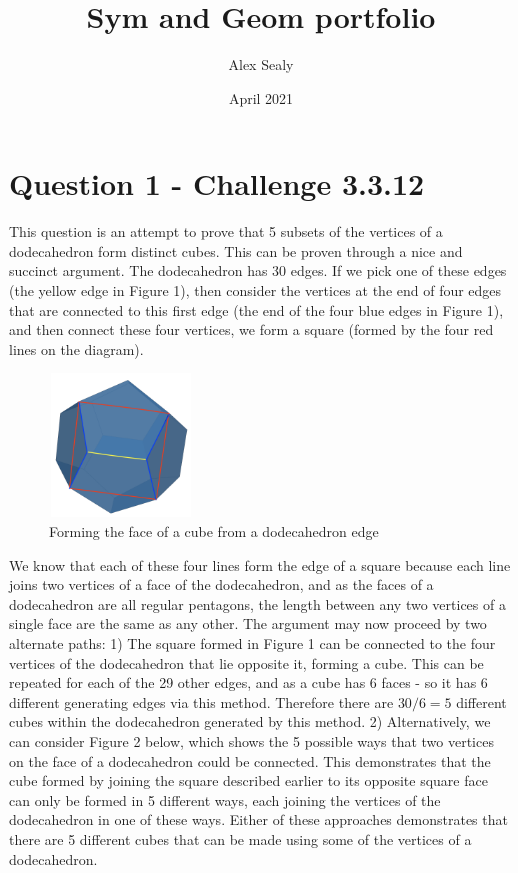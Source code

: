 \documentclass{article}
\title{Sym and Geom portfolio}
\author{Alex Sealy }
\date{April 2021}
\begin{document}
\maketitle


\section{Question 1 -  Challenge 3.3.12}
This question is an attempt to prove that 5 subsets of the vertices of a dodecahedron form distinct cubes.
This can be proven through a nice and succinct argument. The dodecahedron has 30 edges. If we pick one of these edges (the yellow edge in Figure 1), then consider the vertices at the end of four edges that are connected to this first edge (the end of the four blue edges in Figure 1), and then connect these four vertices, we form a square (formed by the four red lines on the diagram). 
\begin{figure}[htbp]
\centerline{\includegraphics[width=
1.5in, height=1.5in]{Cube On Dodecahedron.png}}
\caption{Forming the face of a cube from a dodecahedron edge}
\label{fig1}
\end{figure}

We know that each of these four lines form the edge of a square because each line joins two vertices of a face of the dodecahedron, and as the faces of a dodecahedron are all regular pentagons, the length between any two vertices of a single face are the same as any other. The argument may now proceed by two alternate paths: 1) The square formed in Figure 1 can be connected to the four vertices of the dodecahedron that lie opposite it, forming a cube. This can be repeated for each of the 29 other edges, and as a cube has 6 faces - so it has 6 different generating edges via this method. Therefore there are $30/6 = 5$ different cubes within the dodecahedron generated by this method. 
2) Alternatively, we can consider Figure 2 below, which shows the 5 possible ways that two vertices on the face of a dodecahedron could be connected. This demonstrates that the cube formed by joining the square described earlier to its opposite square face can only be formed in 5 different ways, each joining the vertices of the dodecahedron in one of these ways. Either of these approaches demonstrates that there are 5 different cubes that can be made using some of the vertices of a dodecahedron.
\end{document}
